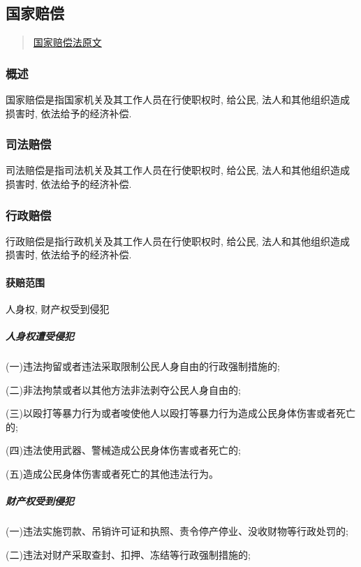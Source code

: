 \subsection{国家赔偿}

\begin{quote}
    \href{https://www.gjxfj.gov.cn/gjxfj/xxgk/fgwj/flfg/webinfo/2016/03/1460585589927542.htm}{国家赔偿法原文}
\end{quote}

\subsubsection{概述}

国家赔偿是指国家机关及其工作人员在行使职权时, 给公民, 法人和其他组织造成损害时, 依法给予的经济补偿.

\subsubsection{司法赔偿}

司法赔偿是指司法机关及其工作人员在行使职权时, 给公民, 法人和其他组织造成损害时, 依法给予的经济补偿.

\subsubsection{行政赔偿}

行政赔偿是指行政机关及其工作人员在行使职权时, 给公民, 法人和其他组织造成损害时, 依法给予的经济补偿.

\paragraph{获赔范围} 人身权, 财产权受到侵犯

\subparagraph{人身权遭受侵犯}

(一)违法拘留或者违法采取限制公民人身自由的行政强制措施的;

(二)非法拘禁或者以其他方法非法剥夺公民人身自由的;

(三)以殴打等暴力行为或者唆使他人以殴打等暴力行为造成公民身体伤害或者死亡的;

(四)违法使用武器、警械造成公民身体伤害或者死亡的;

(五)造成公民身体伤害或者死亡的其他违法行为。

\subparagraph{财产权受到侵犯}

(一)违法实施罚款、吊销许可证和执照、责令停产停业、没收财物等行政处罚的;

(二)违法对财产采取查封、扣押、冻结等行政强制措施的;

